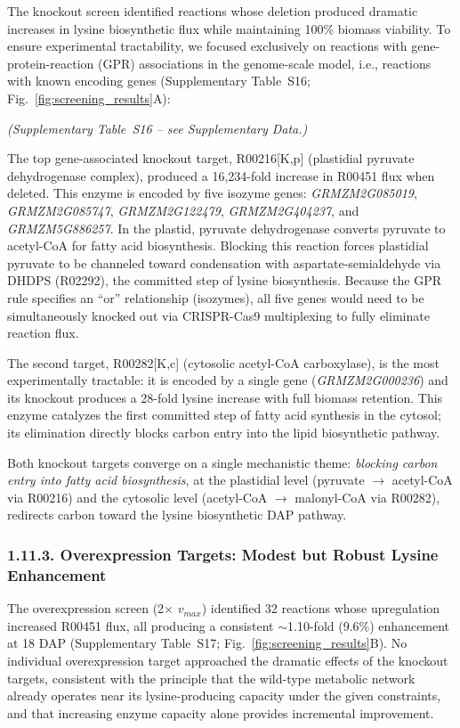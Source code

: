 \documentclass[12pt,a4paper]{article}
\begin{document}
The knockout screen identified reactions whose deletion produced dramatic increases in lysine biosynthetic flux while maintaining 100\% biomass viability. To ensure experimental tractability, we focused exclusively on reactions with gene-protein-reaction (GPR) associations in the genome-scale model, i.e., reactions with known encoding genes (Supplementary Table~S16; Fig.~\ref{fig:screening_results}A):


\noindent\textit{(Supplementary Table~S16 -- see Supplementary Data.)}


The top gene-associated knockout target, R00216[K,p] (plastidial pyruvate dehydrogenase complex), produced a 16,234-fold increase in R00451 flux when deleted. This enzyme is encoded by five isozyme genes: \textit{GRMZM2G085019}, \textit{GRMZM2G085747}, \textit{GRMZM2G122479}, \textit{GRMZM2G404237}, and \textit{GRMZM5G886257}. In the plastid, pyruvate dehydrogenase converts pyruvate to acetyl-CoA for fatty acid biosynthesis. Blocking this reaction forces plastidial pyruvate to be channeled toward condensation with aspartate-semialdehyde via DHDPS (R02292), the committed step of lysine biosynthesis. Because the GPR rule specifies an ``or'' relationship (isozymes), all five genes would need to be simultaneously knocked out via CRISPR-Cas9 multiplexing to fully eliminate reaction flux.

The second target, R00282[K,c] (cytosolic acetyl-CoA carboxylase), is the most experimentally tractable: it is encoded by a single gene (\textit{GRMZM2G000236}) and its knockout produces a 28-fold lysine increase with full biomass retention. This enzyme catalyzes the first committed step of fatty acid synthesis in the cytosol; its elimination directly blocks carbon entry into the lipid biosynthetic pathway.

Both knockout targets converge on a single mechanistic theme: \textit{blocking carbon entry into fatty acid biosynthesis}, at the plastidial level (pyruvate $\rightarrow$ acetyl-CoA via R00216) and the cytosolic level (acetyl-CoA $\rightarrow$ malonyl-CoA via R00282), redirects carbon toward the lysine biosynthetic DAP pathway.

\subsubsection{1.11.3. Overexpression Targets: Modest but Robust Lysine Enhancement}

The overexpression screen (2$\times$ $v_{max}$) identified 32 reactions whose upregulation increased R00451 flux, all producing a consistent $\sim$1.10-fold (9.6\%) enhancement at 18 DAP (Supplementary Table~S17; Fig.~\ref{fig:screening_results}B). No individual overexpression target approached the dramatic effects of the knockout targets, consistent with the principle that the wild-type metabolic network already operates near its lysine-producing capacity under the given constraints, and that increasing enzyme capacity alone provides incremental improvement.
\end{document}
